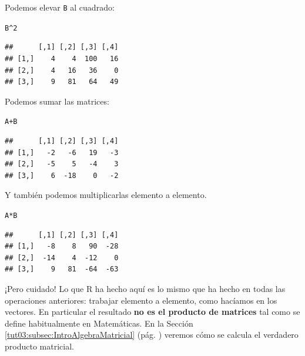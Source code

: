 \documentclass[10pt,a4paper]{article}\usepackage[]{graphicx}\usepackage[]{color}
\makeatletter
\newcommand{\hlnum}[1]{\textcolor[rgb]{0.686,0.059,0.569}{#1}}%
\newcommand{\hlopt}[1]{\textcolor[rgb]{0,0,0}{#1}}%
\newcommand{\hlstd}[1]{\textcolor[rgb]{0.345,0.345,0.345}{#1}}%
\newenvironment{kframe}{%
 \def\at@end@of@kframe{}%
 \ifinner\ifhmode%
  \def\at@end@of@kframe{\end{minipage}}%
  \begin{minipage}{\columnwidth}%
 \fi\fi%
 \def\FrameCommand##1{\hskip\@totalleftmargin \hskip-\fboxsep
 \colorbox{shadecolor}{##1}\hskip-\fboxsep
     \hskip-\linewidth \hskip-\@totalleftmargin \hskip\columnwidth}%
 \MakeFramed {\advance\hsize-\width
   \@totalleftmargin\z@ \linewidth\hsize
   \@setminipage}}%
 {\par\unskip\endMakeFramed%
 \at@end@of@kframe}
\newenvironment{knitrout}{}{} %
\makeatother
\begin{document}
     Podemos elevar {\tt B} al cuadrado:
\begin{knitrout}
\color{fgcolor}\begin{kframe}
\begin{alltt}
\hlstd{B}\hlopt{^}\hlnum{2}
\end{alltt}
\begin{verbatim}
##      [,1] [,2] [,3] [,4]
## [1,]    4    4  100   16
## [2,]    4   16   36    0
## [3,]    9   81   64   49
\end{verbatim}
\end{kframe}
\end{knitrout}
     Podemos sumar las matrices:
\begin{knitrout}
\color{fgcolor}\begin{kframe}
\begin{alltt}
\hlstd{A} \hlopt{+} \hlstd{B}
\end{alltt}
\begin{verbatim}
##      [,1] [,2] [,3] [,4]
## [1,]   -2   -6   19   -3
## [2,]   -5    5   -4    3
## [3,]    6  -18    0   -2
\end{verbatim}
\end{kframe}
\end{knitrout}
     Y también podemos multiplicarlas elemento a elemento.
\begin{knitrout}
\color{fgcolor}\begin{kframe}
\begin{alltt}
     \hlstd{A} \hlopt{*} \hlstd{B}
\end{alltt}
\begin{verbatim}
##      [,1] [,2] [,3] [,4]
## [1,]   -8    8   90  -28
## [2,]  -14    4  -12    0
## [3,]    9   81  -64  -63
\end{verbatim}
\end{kframe}
\end{knitrout}
     ¡Pero cuidado! Lo que R ha hecho aquí es lo mismo que ha hecho en todas las operaciones anteriores: trabajar elemento a elemento, como hacíamos en los vectores. En particular el resultado {\bf no es el producto de matrices} tal como se define habitualmente en Matemáticas. En la Sección \ref{tut03:subsec:IntroAlgebraMatricial} (pág. \pageref{tut03:subsec:IntroAlgebraMatricial}) veremos cómo se calcula el verdadero producto matricial.
\end{document}

